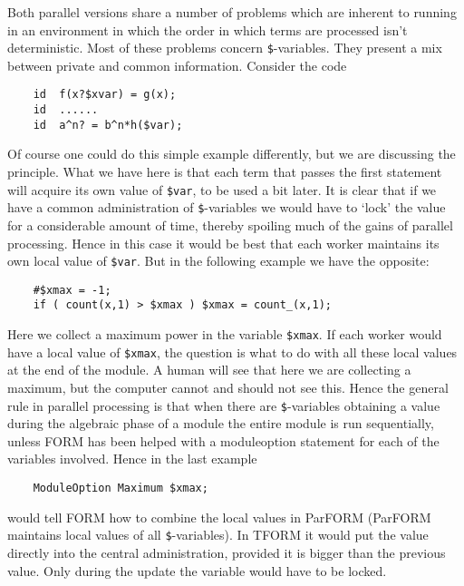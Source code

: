 Both parallel versions share a number of problems which are inherent to 
running in an environment in which the order in which 
terms are processed isn't deterministic. Most of these 
problems concern \verb:$:-variables. They present a mix between private and 
common information. Consider the code
\begin{verbatim}
    id  f(x?$xvar) = g(x);
    id  ......
    id  a^n? = b^n*h($var);
\end{verbatim}
Of course one could do this simple example differently, but we are 
discussing the principle. What we have here is that each term that passes 
the first statement will acquire its own value of \verb:$var:, to be used a 
bit later. It is clear that if we have a common administration of 
\verb:$:-variables we would have to `lock' the value for a 
considerable amount of time, thereby spoiling much of the gains of parallel 
processing. Hence in this case it would be best that each worker maintains 
its own local value of \verb:$var:. But in the following example we have 
the opposite:
\begin{verbatim}
    #$xmax = -1;
    if ( count(x,1) > $xmax ) $xmax = count_(x,1);
\end{verbatim}
Here we collect a maximum power in the variable \verb:$xmax:. If each 
worker would have a local value of \verb:$xmax:, the question is what to do 
with all these local values at the end of the module. A human will see that 
here we are collecting a maximum, but the computer cannot and should not 
see this. Hence the general rule in parallel processing is that when there 
are \verb:$:-variables obtaining a value during the 
algebraic phase of a module the entire module is run sequentially, unless 
FORM has been helped with a moduleoption statement for each of the 
variables involved. Hence in the last example
\begin{verbatim}
    ModuleOption Maximum $xmax;
\end{verbatim}
would tell FORM how to combine the local values in ParFORM (ParFORM 
maintains local values of all \verb:$:-variables). In TFORM it 
would put the value directly into the central administration, provided it 
is bigger than the previous value. Only during the update the variable 
would have to be locked.

